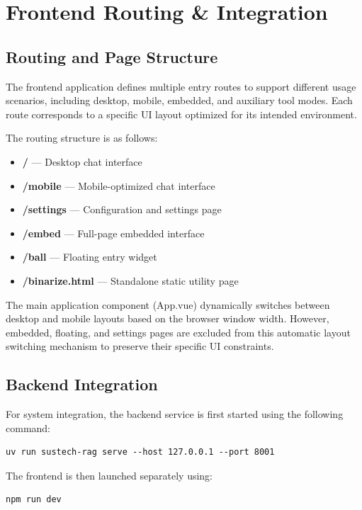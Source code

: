 \chapter{Frontend Routing & Integration}
\section{Routing and Page Structure}

The frontend application defines multiple entry routes to support different usage scenarios, including desktop, mobile, embedded, and auxiliary tool modes. Each route corresponds to a specific UI layout optimized for its intended environment.

The routing structure is as follows:

\begin{itemize}
    \item \textbf{/} — Desktop chat interface
    \item \textbf{/mobile} — Mobile-optimized chat interface
    \item \textbf{/settings} — Configuration and settings page
    \item \textbf{/embed} — Full-page embedded interface
    \item \textbf{/ball} — Floating entry widget
    \item \textbf{/binarize.html} — Standalone static utility page
\end{itemize}

The main application component (App.vue) dynamically switches between desktop and mobile layouts based on the browser window width. However, embedded, floating, and settings pages are excluded from this automatic layout switching mechanism to preserve their specific UI constraints.

\section{Backend Integration}

For system integration, the backend service is first started using the following command:

\begin{verbatim}
uv run sustech-rag serve --host 127.0.0.1 --port 8001
\end{verbatim}

The frontend is then launched separately using:

\begin{verbatim}
npm run dev
\end{verbatim}

